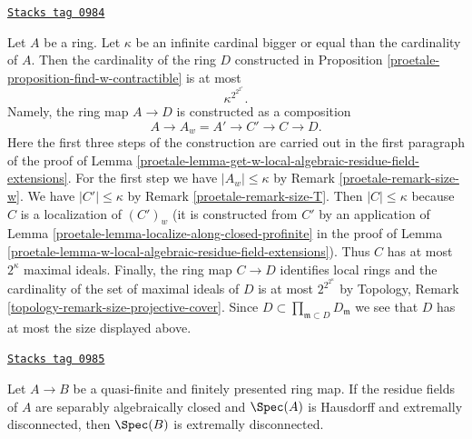 \begin{remark}
\label{proetale-remark-size-w-contractible}
\href{https://stacks.math.columbia.edu/tag/0984}{\texttt{Stacks tag 0984}}

Let $A$ be a ring. Let $\kappa$ be an infinite cardinal bigger or
equal than the cardinality of $A$. Then the cardinality of the
ring $D$ constructed in Proposition \ref{proetale-proposition-find-w-contractible}
is at most
$$
\kappa^{2^{2^{2^\kappa}}}.
$$
Namely, the ring map $A \to D$ is
constructed as a composition
$$
A \to A_w = A' \to C' \to C \to D.
$$
Here the first three steps of the construction are carried out
in the first paragraph of the proof of
Lemma \ref{proetale-lemma-get-w-local-algebraic-residue-field-extensions}.
For the first step we have $|A_w| \leq \kappa$ by
Remark \ref{proetale-remark-size-w}.
We have $|C'| \leq \kappa$ by
Remark \ref{proetale-remark-size-T}.
Then $|C| \leq \kappa$ because $C$ is a localization of $(C')_w$
(it is constructed from $C'$ by an application of
Lemma \ref{proetale-lemma-localize-along-closed-profinite}
in the proof of Lemma \ref{proetale-lemma-w-local-algebraic-residue-field-extensions}).
Thus $C$ has at most $2^\kappa$ maximal ideals.
Finally, the ring map $C \to D$ identifies local rings and the
cardinality of the set of maximal ideals of $D$ is at most
$2^{2^{2^\kappa}}$ by
Topology, Remark \ref{topology-remark-size-projective-cover}.
Since $D \subset \prod_{\mathfrak m \subset D} D_\mathfrak m$ we see
that $D$ has at most the size displayed above.
\end{remark}

\begin{lemma}
\label{proetale-lemma-finite-finitely-presented-over-extremally-disconnected}
\href{https://stacks.math.columbia.edu/tag/0985}{\texttt{Stacks tag 0985}}

Let $A \to B$ be a quasi-finite and finitely presented ring map.
If the residue fields of $A$ are separably algebraically closed
and $\Spec(A)$ is Hausdorff and extremally disconnected, then $\Spec(B)$ is
extremally disconnected.
\end{lemma}

